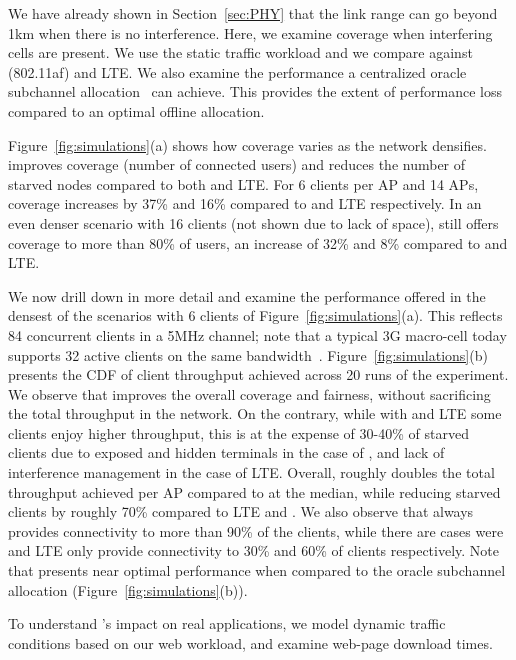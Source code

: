 \vskip 2pt
We have already shown in Section~\ref{sec:PHY} that the link range can go beyond 1km when there is no interference. 
Here, we examine coverage when interfering cells are present. 
We use the static traffic workload and we compare \cf against \wf (802.11af) and LTE.
We also examine the performance a centralized oracle subchannel allocation~\cite{fermi} can achieve.
This provides the extent of performance loss compared to an optimal offline allocation.

Figure~\ref{fig:simulations}(a) shows how coverage varies as the network densifies. 
\cf improves coverage (number of connected users) 
and reduces the number of starved nodes compared to both \cf and LTE. 
For 6 clients per AP and 14 APs, coverage increases by 37\% and 16\% compared to \wf and LTE respectively. 
In an even denser scenario with 16 clients (not shown due to lack of space), 
\cf still offers coverage to more than 80\% of users, an increase of 32\% and 8\% compared to \wf and LTE. 

We now drill down in more detail and examine the performance offered in the densest of the scenarios with 6 clients of Figure~\ref{fig:simulations}(a).
This reflects 84 concurrent clients in a 5MHz channel; note that a typical 3G macro-cell today supports 32 active clients on the same bandwidth~\cite{quora}. 
Figure~\ref{fig:simulations}(b) presents the CDF of client throughput achieved across 20 runs of the experiment.
We observe that \cf improves the overall coverage and fairness, without sacrificing the total throughput in the network.
On the contrary, while with \wf and LTE some clients enjoy higher throughput, this is at the expense of 30-40\% of starved clients due to 
exposed and hidden terminals in the case of \wf, and lack of interference management in the case of LTE. 
Overall, \cf roughly doubles the total throughput achieved per AP compared to \wf at the median, while 
reducing starved clients by roughly 70\% compared to LTE and \wf. 
We also observe that \cf always provides connectivity to more than 90\% of the clients,
while there are cases were \wf and LTE only provide connectivity to 30\% and 60\% of clients respectively.
Note that \cf presents near optimal performance when compared to 
the oracle subchannel allocation (Figure~\ref{fig:simulations}(b)). 



To understand \cf's impact on real applications, we model dynamic traffic conditions based
on our web workload, and examine web-page download times. 

